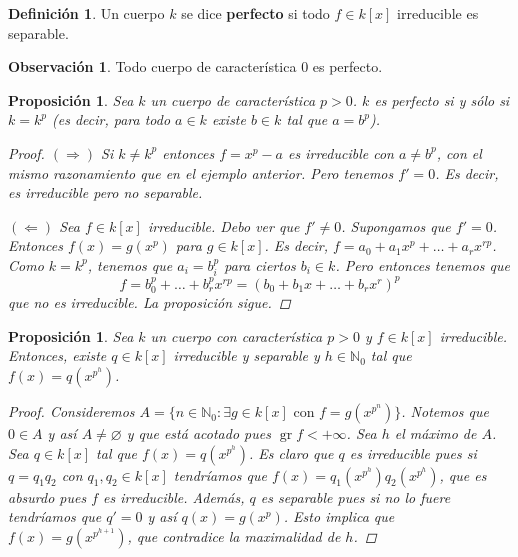 \documentclass[12pt]{book}
\newtheorem{prop}[teo]{Proposición}
\theoremstyle{definition}
\newtheorem{obs}[teo]{Observación}
\newtheorem{defn}[teo]{Definición}
\newcommand{\NN}{\mathbb{N}}
\let\emptyset\varnothing
\DeclareMathOperator{\gr}{gr}
\begin{document}
\begin{defn}
Un cuerpo $k$ se dice \textbf{perfecto} si todo $f\in k[x]$ irreducible es separable.
\end{defn}

\begin{obs}
Todo cuerpo de característica $0$ es perfecto.
\end{obs}

\begin{prop}
Sea $k$ un cuerpo de característica $p>0$. $k$ es perfecto si y sólo si $k=k^p$ (es decir, para todo $a\in k$ existe $b\in k$ tal que $a=b^p$).
\begin{proof}
$(\Longrightarrow)$ Si $k\neq k^p$ entonces $f=x^p - a$ es irreducible con $a\neq b^p$, con el mismo razonamiento que en el ejemplo anterior. Pero tenemos $f'=0$. Es decir, es irreducible pero no separable.

$(\Longleftarrow)$ Sea $f\in k[x]$ irreducible. Debo ver que $f'\neq 0$. Supongamos que $f'=0$. Entonces $f(x)=g(x^p)$ para $g\in k[x]$. Es decir, $f = a_0 + a_1x^p + \ldots + a_r x^{rp}$. Como $k=k^p$, tenemos que $a_i = b_i^p$ para ciertos $b_i\in k$. Pero entonces tenemos que $$f= b_0^p + \ldots + b_r^p x^{rp} = (b_0 + b_1x + \ldots + b_rx^r)^p$$ que no es irreducible. La proposición sigue.
\end{proof}
\end{prop}

\begin{prop}
Sea $k$ un cuerpo con característica $p>0$ y $f\in k[x]$ irreducible. Entonces, existe $q\in k[x]$ irreducible y separable y $h\in\NN_0$ tal que $f(x) = q(x^{p^h})$.
\begin{proof}
Consideremos $A=\{n\in\NN_0 : \exists g\in k[x] \text{ con }f=g(x^{p^n})\}$. Notemos que $0\in A$ y así $A\neq\emptyset$ y que está acotado pues $\gr f<+\infty$. Sea $h$ el máximo de $A$. Sea $q\in k[x]$ tal que $f(x)=q(x^{p^h})$. Es claro que $q$ es irreducible pues si $q=q_1q_2$ con $q_1,q_2\in k[x]$ tendríamos que $f(x) = q_1(x^{p^h})q_2(x^{p^h})$, que es absurdo pues $f$ es irreducible. Además, $q$ es separable pues si no lo fuere tendríamos que $q'=0$ y así $q(x)=g(x^p)$. Esto implica que $f(x)=g(x^{p^{h+1}})$, que contradice la maximalidad de $h$.
\end{proof}
\end{prop}
\end{document}
